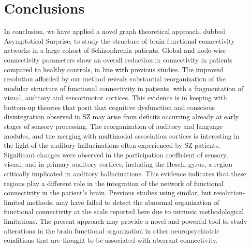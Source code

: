 \section{Conclusions}
In conclusion, we have applied a novel graph theoretical approach, dubbed Asymptotical Surprise, to study the structure of brain functional connectivity networks in a large cohort of Schizophrenia patients.
Global and node-wise connectivity parameters show an overall reduction in connectivity in patients compared to healthy controls, in line with previous studies.
The improved resolution afforded by our method reveals substantial reorganization of the modular structure of functional connectivity in patients, with a fragmentation of visual, auditory and sensorimotor cortices.
This evidence is in keeping with bottom-up theories that posit that cognitive dysfunction and conscious disintegration observed in SZ may arise from deficits occurring already at early stages of sensory processing.
The reorganization of auditory and language modules, and the merging with multimodal association cortices is interesting in the light of the auditory hallucinations often experienced by SZ patients.
Significant changes were observed in the participation coefficient of sensory, visual, and in primary auditory cortices, including the Heschl gyrus, a region critically implicated in auditory hallucinations.
This evidence indicates that these regions play a different role in the integration of the network of functional connectivity in the patient’s brain.
Previous studies using similar, but resolution-limited methods, may have failed to detect the abnormal organization of functional connectivity at the scale reported here due to intrinsic methodological limitations.
The present approach may provide a novel and powerful tool to study alterations in the brain functional organization in other neuropsychiatric conditions that are thought to be associated with aberrant connectivity.



